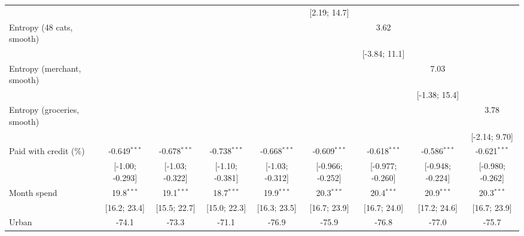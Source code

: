 \begin{table}[htbp]
\begin{threeparttable}[b]
\begin{tabular}{lcccccccc}
                                     &                 &                 &                 &                 & [2.19; 14.7]     &                  &                  &   \\   
         Entropy (48 cats, smooth)   &                 &                 &                 &                 &                  & 3.62             &                  &   \\   
                                     &                 &                 &                 &                 &                  & [-3.84; 11.1]    &                  &   \\   
         Entropy (merchant, smooth)  &                 &                 &                 &                 &                  &                  & 7.03             &   \\   
                                     &                 &                 &                 &                 &                  &                  & [-1.38; 15.4]    &   \\   
         Entropy (groceries, smooth) &                 &                 &                 &                 &                  &                  &                  & 3.78\\   
                                     &                 &                 &                 &                 &                  &                  &                  & [-2.14; 9.70]\\   
         Paid with credit (\%)       & -0.649$^{***}$  & -0.678$^{***}$  & -0.738$^{***}$  & -0.668$^{***}$  & -0.609$^{***}$   & -0.618$^{***}$   & -0.586$^{***}$   & -0.621$^{***}$\\   
                                     & [-1.00; -0.293] & [-1.03; -0.322] & [-1.10; -0.381] & [-1.03; -0.312] & [-0.966; -0.252] & [-0.977; -0.260] & [-0.948; -0.224] & [-0.980; -0.262]\\   
         Month spend                 & 19.8$^{***}$    & 19.1$^{***}$    & 18.7$^{***}$    & 19.9$^{***}$    & 20.3$^{***}$     & 20.4$^{***}$     & 20.9$^{***}$     & 20.3$^{***}$\\   
                                     & [16.2; 23.4]    & [15.5; 22.7]    & [15.0; 22.3]    & [16.3; 23.5]    & [16.7; 23.9]     & [16.7; 24.0]     & [17.2; 24.6]     & [16.7; 23.9]\\   
         Urban                       & -74.1           & -73.3           & -71.1           & -76.9           & -75.9            & -76.8            & -77.0            & -75.7\\   

\end{tabular}
\end{threeparttable}
\end{table}
